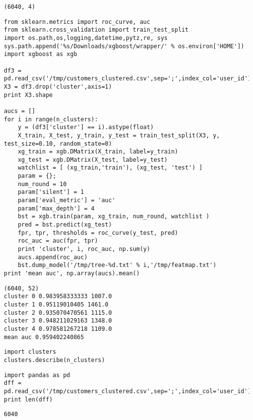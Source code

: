 \documentclass[12pt,fleqn]{article}\usepackage{../common}
\begin{document}
\begin{verbatim}
(6040, 4)
\end{verbatim}

\begin{verbatim}
from sklearn.metrics import roc_curve, auc
from sklearn.cross_validation import train_test_split
import os.path,os,logging,datetime,pytz,re, sys
sys.path.append('%s/Downloads/xgboost/wrapper/' % os.environ['HOME'])
import xgboost as xgb

df3 = pd.read_csv('/tmp/customers_clustered.csv',sep=';',index_col='user_id')
X3 = df3.drop('cluster',axis=1)
print X3.shape

aucs = []
for i in range(n_clusters):
    y = (df3['cluster'] == i).astype(float)    
    X_train, X_test, y_train, y_test = train_test_split(X3, y, test_size=0.10, random_state=0)
    xg_train = xgb.DMatrix(X_train, label=y_train)
    xg_test = xgb.DMatrix(X_test, label=y_test)    
    watchlist = [ (xg_train,'train'), (xg_test, 'test') ]    
    param = {}; 
    num_round = 10
    param['silent'] = 1
    param['eval_metric'] = 'auc'
    param['max_depth'] = 4
    bst = xgb.train(param, xg_train, num_round, watchlist )
    pred = bst.predict(xg_test)
    fpr, tpr, thresholds = roc_curve(y_test, pred)
    roc_auc = auc(fpr, tpr)
    print 'cluster', i, roc_auc, np.sum(y)
    aucs.append(roc_auc)
    bst.dump_model('/tmp/tree-%d.txt' % i,'/tmp/featmap.txt')
print 'mean auc', np.array(aucs).mean()
\end{verbatim}

\begin{verbatim}
(6040, 52)
cluster 0 0.983958333333 1007.0
cluster 1 0.95119010405 1461.0
cluster 2 0.935070470561 1115.0
cluster 3 0.948211029163 1348.0
cluster 4 0.978581267218 1109.0
mean auc 0.959402240865
\end{verbatim}

\begin{verbatim}
import clusters
clusters.describe(n_clusters)
\end{verbatim}

\begin{verbatim}
import pandas as pd
dff = pd.read_csv('/tmp/customers_clustered.csv',sep=';',index_col='user_id')
print len(dff)
\end{verbatim}

\begin{verbatim}
6040
\end{verbatim}
\end{document}
